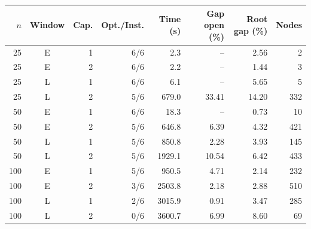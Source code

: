 \begin{tabular}{rcrrrrrr}
\toprule
$n$ & Window & Cap. & Opt./Inst. & Time (s) & Gap open (\%) & Root gap (\%) & Nodes \\
\midrule
25 & E & 1 & 6/6 & 2.3 & -- & 2.56 & 2 \\
25 & E & 2 & 6/6 & 2.2 & -- & 1.44 & 3 \\
25 & L & 1 & 6/6 & 6.1 & -- & 5.65 & 5 \\
25 & L & 2 & 5/6 & 679.0 & 33.41 & 14.20 & 332 \\
50 & E & 1 & 6/6 & 18.3 & -- & 0.73 & 10 \\
50 & E & 2 & 5/6 & 646.8 & 6.39 & 4.32 & 421 \\
50 & L & 1 & 5/6 & 850.8 & 2.28 & 3.93 & 145 \\
50 & L & 2 & 5/6 & 1929.1 & 10.54 & 6.42 & 433 \\
100 & E & 1 & 5/6 & 950.5 & 4.71 & 2.14 & 232 \\
100 & E & 2 & 3/6 & 2503.8 & 2.18 & 2.88 & 510 \\
100 & L & 1 & 2/6 & 3015.9 & 0.91 & 3.47 & 285 \\
100 & L & 2 & 0/6 & 3600.7 & 6.99 & 8.60 & 69 \\
\bottomrule
\end{tabular}